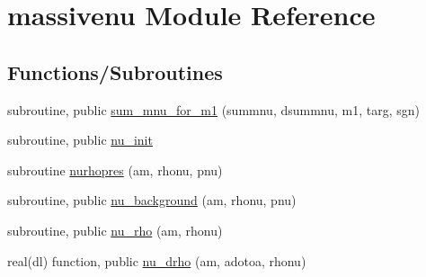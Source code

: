 \hypertarget{namespacemassivenu}{}\section{massivenu Module Reference}
\label{namespacemassivenu}
\subsection*{Functions/\+Subroutines}
\begin{DoxyCompactItemize}
\item 
subroutine, public \mbox{\hyperlink{namespacemassivenu_a872d62098a8fc9b6d372d05bc210c428}{sum\+\_\+mnu\+\_\+for\+\_\+m1}} (summnu, dsummnu, m1, targ, sgn)
\item 
subroutine, public \mbox{\hyperlink{namespacemassivenu_acf78f8f20c4f8c680d7f239aaffbc826}{nu\+\_\+init}}
\item 
subroutine \mbox{\hyperlink{namespacemassivenu_ae38eedf1b14513e212f542f0afcb8a7f}{nurhopres}} (am, rhonu, pnu)
\item 
subroutine, public \mbox{\hyperlink{namespacemassivenu_a30a55d3fc963ae76797cb114a3bd8818}{nu\+\_\+background}} (am, rhonu, pnu)
\item 
subroutine, public \mbox{\hyperlink{namespacemassivenu_a5e5e907b67a43f82b29065f75a696ae5}{nu\+\_\+rho}} (am, rhonu)
\item 
real(dl) function, public \mbox{\hyperlink{namespacemassivenu_a095ca5fb68fcb4e3b808e4dcf0f2f34d}{nu\+\_\+drho}} (am, adotoa, rhonu)
\end{DoxyCompactItemize}
